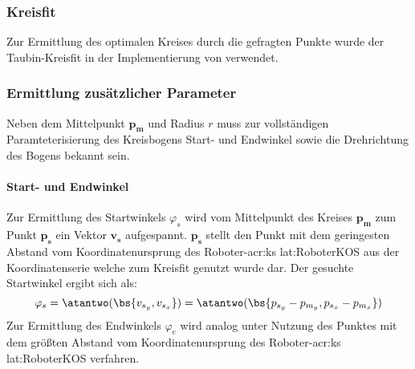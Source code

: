 \subsubsection{Kreisfit} 
Zur Ermittlung des optimalen Kreises durch die gefragten Punkte wurde der Taubin-Kreisfit \autocite{taubinEstimationPlanarCurves1991} in der Implementierung von \autocite{nikolaichernovMATLABCodesFitting} verwendet. 

\subsubsection{Ermittlung zusätzlicher Parameter}
Neben dem Mittelpunkt \(\boldsymbol{p_m}\) und Radius \(r\) muss zur vollständigen Paramteterisierung des Kreisbogens Start- und Endwinkel sowie die Drehrichtung des Bogens bekannt sein.

\paragraph{Start- und Endwinkel}
Zur Ermittlung des Startwinkels \( \varphi_s \) wird vom Mittelpunkt des Kreises \(\boldsymbol{p_m}\) zum Punkt  \(\boldsymbol{p_s}\) ein Vektor \(\boldsymbol{v_s}\) aufgespannt.  \(\boldsymbol{p_s}\) stellt den Punkt mit dem geringesten Abstand vom Koordinatenursprung des Roboter-\gls{acr:ks} \gls{lat:RoboterKOS} aus der Koordinatenserie welche zum Kreisfit genutzt wurde dar.  Der gesuchte Startwinkel ergibt sich als:
\begin{equation}
\varphi_s =
\atantwo (\bs{v_{s_y}, v_{s_x}}) = 
\atantwo (\bs{p_{s_y}-p_{m_y}, p_{s_x}-p_{m_x}})
\end{equation}
Zur Ermittlung des Endwinkels \( \varphi_e \) wird analog unter Nutzung des Punktes mit dem größten Abstand vom Koordinatenursprung des Roboter-\gls{acr:ks} \gls{lat:RoboterKOS} verfahren.

